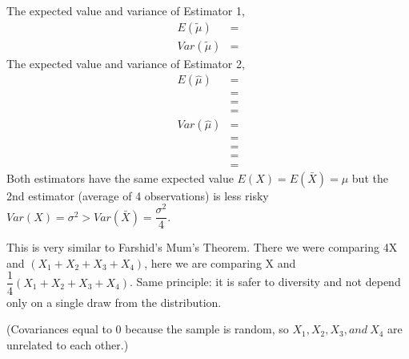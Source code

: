 \documentclass[12pt]{report}
\begin{document}
\noindent The expected value and variance of Estimator 1,
\begin{align*}
	E(\tilde{\mu}) &= \\
	Var(\tilde{\mu}) &=
\end{align*}
\noindent The expected value and variance of Estimator 2, 
\begin{align*}
E(\hat{\mu}) &=  \\
&= \\
&= \\
&= \\
Var(\hat{\mu}) &= \\
&=  \\
&= \\
&= \\
&= 
\end{align*}
\noindent Both estimators have the same expected value $E(X) = E(\bar{X}) = \mu$ but the 2nd estimator (average of 4 observations) is less risky $Var(X) = \sigma^2 > Var(\bar{X}) = \dfrac{\sigma^2}{4}$.

\noindent This is very similar to Farshid's Mum's Theorem. There we were comparing 4X and $(X_1+X_2+X_3+X_4)$, here we are comparing X and $\dfrac{1}{4}(X_1+X_2+X_3+X_4)$. Same principle: it is safer to diversity and not depend only on a single draw from the distribution.

\noindent (Covariances equal to 0 because the sample is random, so $X_1, X_2, X_3, and\ X_4$ are unrelated to each other.)


\end{document}
